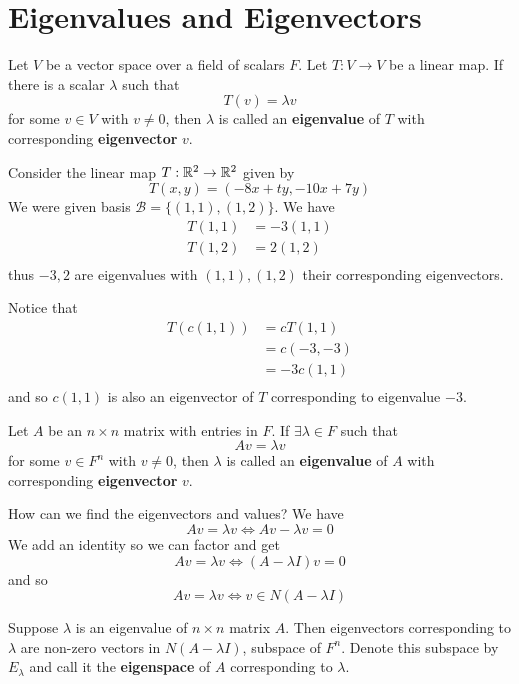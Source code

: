 \documentclass{article}
\begin{document}
\section{Eigenvalues and Eigenvectors}
\begin{definition}
  Let $V$ be a vector space over a field of scalars $F$. Let $T: V \to V$ be a linear map. If there is a scalar $\lambda$ such that \[
    T(v) = \lambda v
  \] for some $v \in V$ with $v \neq 0$, then $\lambda$ is called an \textbf{eigenvalue} of $T$ with corresponding \textbf{eigenvector} $v$.
\end{definition}
\begin{example}
  Consider the linear map $T: \mathbb{R}^2 \to \mathbb{R}^2$ given by \[
    T(x, y) = (-8x + ty, -10x + 7y)
  \] We were given basis $\mathcal{B} = \{(1, 1), (1, 2)\}$. We have
  \begin{align*}
    T(1, 1) & = -3(1, 1) \\
    T(1, 2) & = 2(1, 2)  \\
  \end{align*} thus $-3, 2$ are eigenvalues with $(1, 1), (1, 2)$ their corresponding eigenvectors.

  Notice that
  \begin{align*}
    T(c(1, 1)) & = cT(1, 1)  \\
               & = c(-3, -3) \\
               & = -3c(1, 1) \\
  \end{align*} and so $c(1, 1)$ is also an eigenvector of $T$ corresponding to eigenvalue $-3$.
\end{example}
\begin{definition}
  Let $A$ be an $n \times n$ matrix with entries in $F$. If $\exists \lambda \in F$ such that \[
    Av = \lambda v
  \] for some $v \in F^n$ with $v \neq 0$, then $\lambda$ is called an \textbf{eigenvalue} of $A$ with corresponding \textbf{eigenvector} $v$.
\end{definition}
\begin{remark}
  How can we find the eigenvectors and values? We have \[
    Av = \lambda v \iff Av - \lambda v = 0
  \]
  We add an identity so we can factor and get \[
    Av = \lambda v \iff (A - \lambda I)v = 0
  \] and so \[
    Av = \lambda v \iff v \in N(A - \lambda I)
  \]
\end{remark}
\begin{theorem}
  Suppose $\lambda$ is an eigenvalue of $n \times n$ matrix $A$. Then eigenvectors corresponding to $\lambda$ are non-zero vectors in $N(A - \lambda I)$, subspace of $F^n$. Denote this subspace by $E_\lambda$ and call it the \textbf{eigenspace} of $A$ corresponding to $\lambda$.
\end{theorem}
\end{document}
